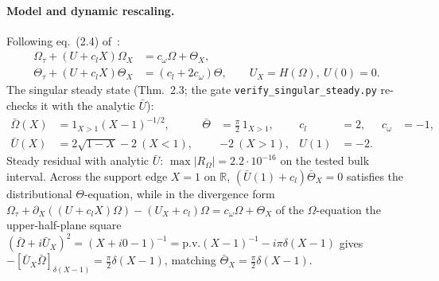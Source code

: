 \documentclass[11pt,a4paper]{article}
\begin{document}
\paragraph{Model and dynamic rescaling.}
Following eq.~(2.4) of~\cite{chen2026houluo}:
\begin{equation}\label{eq:dyn}
\begin{aligned}
\Omega_\tau + (U+c_l X)\Omega_X &= c_\omega\Omega + \Theta_X,\\
\Theta_\tau + (U+c_l X)\Theta_X &= (c_l+2c_\omega)\Theta,\qquad
U_X=H(\Omega),\ U(0)=0.
\end{aligned}
\end{equation}
The singular steady state (Thm.~2.3; the gate \texttt{verify\_singular\_steady.py}
re-checks it with the analytic $\bar U$):
\begin{align*}
\bar\Omega(X)&=1_{X>1}(X-1)^{-1/2},&
\bar\Theta&=\tfrac\pi2\,1_{X>1},&
c_l&=2,& c_\omega&=-1,\\
\bar U(X)&=2\sqrt{1-X}-2\ (X<1),& &-2\ (X>1),&
U(1)&=-2.
\end{align*}
Steady residual with analytic $\bar U$: $\max|R_\Omega|=2.2\cdot10^{-16}$ on the
tested bulk interval.  Across the support edge $X=1$ on $\mathbb{R}$, $(\bar U(1)+c_l)\bar\Theta_X=0$
satisfies the distributional $\Theta$-equation, while in the divergence form
$\Omega_\tau+\partial_X((U+c_l X)\Omega)-(U_X+c_l)\Omega=c_\omega\Omega+\Theta_X$ of the
$\Omega$-equation the upper-half-plane square $(\bar\Omega+i\bar U_X)^2=(X+i0-1)^{-1}=\mathrm{p.v.}(X-1)^{-1}-i\pi\delta(X-1)$
gives $-[\bar U_X\bar\Omega]_{\delta(X-1)}=\tfrac{\pi}{2}\delta(X-1)$, matching $\bar\Theta_X=\tfrac{\pi}{2}\delta(X-1)$.
\end{document}
